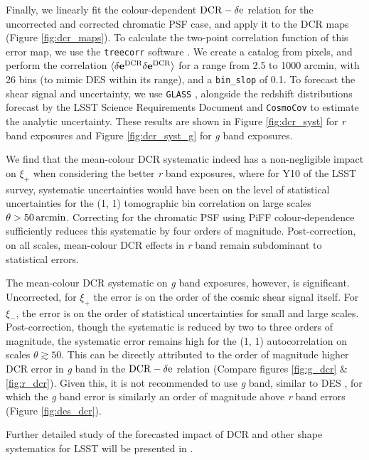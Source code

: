 Finally, we linearly fit the colour-dependent $\rm{DCR}-\delta e$ relation for the uncorrected and corrected chromatic PSF case, and apply it to the DCR maps (Figure \ref{fig:dcr_maps}). 
To calculate the two-point correlation function of this error map, we use the \texttt{treecorr} software \citep{Jarvis2004}. 
We create a catalog from pixels, and perform the correlation $\langle \delta\mathbf{e}^{\rm DCR} \delta\mathbf{e}^{\rm DCR}\rangle$ for a range from 2.5 to 1000 arcmin, with 26 bins (to mimic DES within its range), and a \texttt{bin\_slop} of 0.1.
To forecast the shear signal and uncertainty, we use \texttt{GLASS} \citep{tessore2023}, alongside the redshift distributions forecast by the LSST Science Requirements Document \citep{lsstsrd2018} and \texttt{CosmoCov} \citep{krause2017, fang2020a} to estimate the analytic uncertainty. These results are shown in Figure \ref{fig:dcr_syst} for {\it r} band exposures and Figure \ref{fig:dcr_syst_g} for {\it g} band exposures.

We find that the mean-colour DCR systematic indeed has a non-negligible impact on $\xi_+$ when considering the better {\it r} band exposures, where for Y10 of the LSST survey, systematic uncertainties would have been on the level of statistical uncertainties for the (1, 1) tomographic bin correlation on large scales $\theta > 50 \,  \rm arcmin$. 
Correcting for the chromatic PSF using PiFF colour-dependence sufficiently reduces this systematic by four orders of magnitude.
Post-correction, on all scales, mean-colour DCR effects in {\it r} band remain subdominant to statistical errors.

The mean-colour DCR systematic on {\it g} band exposures, however, is significant. 
Uncorrected, for $\xi_+$ the error is on the order of the cosmic shear signal itself.
For $\xi_-$, the error is on the order of statistical uncertainties for small and large scales.
Post-correction, though the systematic is reduced by two to three orders of magnitude, the systematic error remains high for the (1, 1) autocorrelation on scales $\theta \gtrsim 50$.
This can be directly attributed to the order of magnitude higher DCR error in {\it g} band in the $\rm{DCR}-\delta e$ relation (Compare figures \ref{fig:g_dcr} \& \ref{fig:r_dcr}).
Given this, it is not recommended to use {\it g} band, similar to DES \citep{jarvis2021, schutt2025}, for which the {\it g} band error is similarly an order of magnitude above {\it r} band errors (Figure \ref{fig:des_dcr}).

Further detailed study of the forecasted impact of DCR and other shape systematics for LSST will be presented in  \citet{Agarwal2026}. 